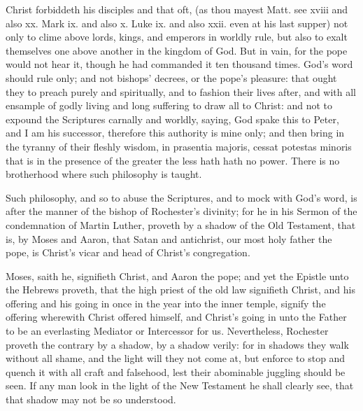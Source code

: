 Christ forbiddeth his disciples and that oft, (as thou mayest 
Matt. see xviii and also xx. Mark ix. and also x. Luke ix. and 
also xxii. even at his last supper) not only to clime above lords, 
kings, and emperors in worldly rule, but also to exalt themselves
one above another in the kingdom of God. But in 
vain, for the pope would not hear it, though he had commanded
it ten thousand times. God's word should rule
only; and not bishops' decrees, or the pope's pleasure: that
ought they to preach purely and spiritually, and to fashion 
their lives after, and with all ensample of godly living and 
long suffering to draw all to Christ: and not to expound 
the Scriptures carnally and worldly, saying, God spake this 
to Peter, and I am his successor, therefore this authority 
is mine only; and then bring in the tyranny of their fleshly 
wisdom, in prasentia majoris, cessat potestas minoris that is
in the presence of the greater the less hath hath no power.
There is no brotherhood where such philosophy is taught. 

Such philosophy, and so to abuse the Scriptures, and to
mock with God's word, is after the manner of the bishop 
of Rochester's divinity; for he in his Sermon of the condemnation
of Martin Luther, proveth by a shadow of the 
Old Testament, that is, by Moses and Aaron, that Satan 
and antichrist, our most holy father the pope, is Christ's 
vicar and head of Christ's congregation. 

Moses, saith he, signifieth Christ, and Aaron the pope; 
and yet the Epistle unto the Hebrews proveth, that the 
high priest of the old law signifieth Christ, and his offering
and his going in once in the year into the inner temple, 
signify the offering wherewith Christ offered himself, and 
Christ's going in unto the Father to be an everlasting Mediator
or Intercessor for us. Nevertheless, Rochester 
proveth the contrary by a shadow, by a shadow verily: for 
in shadows they walk without all shame, and the light will 
they not come at, but enforce to stop and quench it with 
all craft and falsehood, lest their abominable juggling 
should be seen. If any man look in the light of the New 
Testament he shall clearly see, that that shadow may not
be so understood.

